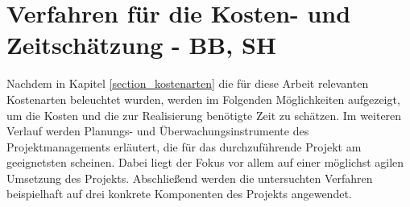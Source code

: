 
\section{Verfahren für die Kosten- und Zeitschätzung - BB, SH}
\label{section_verfahren_schaetzung} %
Nachdem in Kapitel \ref{section_kostenarten} die für diese Arbeit relevanten Kostenarten 
beleuchtet wurden, werden im Folgenden Möglichkeiten aufgezeigt, um die Kosten 
und die zur Realisierung benötigte Zeit zu schätzen. Im weiteren Verlauf werden 
Planungs- und Überwachungsinstrumente des Projektmanagements erläutert, die für 
das durchzuführende Projekt am geeignetsten scheinen. Dabei liegt der Fokus vor 
allem auf einer möglichst agilen Umsetzung des Projekts. Abschließend werden 
die untersuchten Verfahren beispielhaft auf drei konkrete Komponenten des Projekts 
angewendet.





